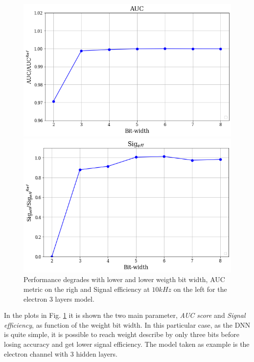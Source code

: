 \documentclass[../../main.tex]{subfiles}
\begin{document}
\begin{figure}[ht] 
  \label{ fig7} 
  \begin{minipage}[b]{0.5\linewidth}
    \centering
    \includegraphics[width=.95\linewidth]{sections/05/Images/Quant_AUC_1ele.png} 
    \vspace{4ex}
  \end{minipage}%
  \begin{minipage}[b]{0.5\linewidth}
    \centering
    \includegraphics[width=.95\linewidth]{sections/05/Images/Quant_SigEff_1ele.png}
    \vspace{4ex}
  \end{minipage}
  \caption{Performance degrades with lower and lower weigth bit width, AUC metric on the righ and Signal efficiency at $10kHz$ on the left for the electron 3 layers model.} 
  \label{fig:quantization_plots}
\end{figure}

In the plots in Fig. \ref{fig:quantization_plots} it is shown the two main parameter,  \textit{AUC score} and \textit{Signal efficiency}, as function of the weight bit width. In this particular case, as the DNN is quite simple, it is possible to reach weight describe by only three bits before losing accuracy and get  lower signal efficiency. The model taken as example is the electron channel with 3 hidden layers.
\end{document}
